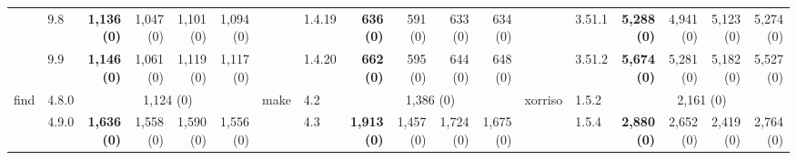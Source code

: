 \begin{table}[]
{\begin{tabular}{l|l|rrrr||l|l|rrrr||l|l|rrrr}
                                 & 9.8                          & \multicolumn{1}{r|}{\textbf{1,136 (0)}} & \multicolumn{1}{r|}{1,047 (0)} & \multicolumn{1}{r|}{1,101 (0)} & 1,094 (0)                        &                              & 1.4.19                       & \multicolumn{1}{r|}{\textbf{636 (0)}}   & \multicolumn{1}{r|}{591 (0)}   & \multicolumn{1}{r|}{633 (0)}   & 634 (0)                          &                              & 3.51.1                       & \multicolumn{1}{r|}{\textbf{5,288 (0)}} & \multicolumn{1}{r|}{4,941 (0)} & \multicolumn{1}{r|}{5,123 (0)} & 5,274 (0)                       \\ \cmidrule(lr){2-6} \cmidrule(lr){8-12} \cmidrule{14-18} 
                                 & 9.9                          & \multicolumn{1}{r|}{\textbf{1,146 (0)}} & \multicolumn{1}{r|}{1,061 (0)} & \multicolumn{1}{r|}{1,119 (0)} & 1,117 (0)                        &                              & 1.4.20                       & \multicolumn{1}{r|}{\textbf{662 (0)}}   & \multicolumn{1}{r|}{595 (0)}   & \multicolumn{1}{r|}{644 (0)}   & 648 (0)                          &                              & 3.51.2                       & \multicolumn{1}{r|}{\textbf{5,674 (0)}} & \multicolumn{1}{r|}{5,281 (0)} & \multicolumn{1}{r|}{5,182 (0)} & 5,527 (0)                       \\ \midrule
    \multirow{3}{*}{find}        & 4.8.0                        & \multicolumn{4}{c||}{1,124 (0)}                                                                                                               & \multirow{3}{*}{make}        & 4.2                          & \multicolumn{4}{c||}{1,386 (0)}                                                                                                               & \multirow{3}{*}{xorriso}     & 1.5.2                        & \multicolumn{4}{c}{2,161 (0)}                                                                                                               \\ \cmidrule(lr){2-6} \cmidrule(lr){8-12} \cmidrule{14-18} 
                                 & 4.9.0                        & \multicolumn{1}{r|}{\textbf{1,636 (0)}} & \multicolumn{1}{r|}{1,558 (0)} & \multicolumn{1}{r|}{1,590 (0)} & 1,556 (0)                        &                              & 4.3                          & \multicolumn{1}{r|}{\textbf{1,913 (0)}} & \multicolumn{1}{r|}{1,457 (0)} & \multicolumn{1}{r|}{1,724 (0)} & 1,675 (0)                        &                              & 1.5.4                        & \multicolumn{1}{r|}{\textbf{2,880 (0)}} & \multicolumn{1}{r|}{2,652 (0)} & \multicolumn{1}{r|}{2,419 (0)} & 2,764 (0)                       \\ \cmidrule(lr){2-6} \cmidrule(lr){8-12} \cmidrule{14-18} 

\end{tabular}}
\end{table}
